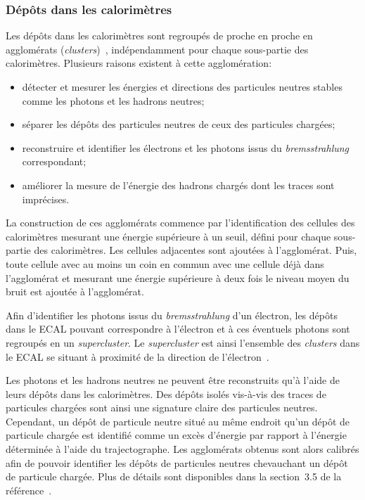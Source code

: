 \subsubsection{Dépôts dans les calorimètres}
Les dépôts dans les calorimètres sont regroupés de proche en proche en agglomérats (\emph{clusters})~\cite{particle-flow}, indépendamment pour chaque sous-partie des calorimètres.
Plusieurs raisons existent à cette agglomération:
\begin{itemize}
\item détecter et mesurer les énergies et directions des particules neutres stables comme les photons et les hadrons neutres;
\item séparer les dépôts des particules neutres de ceux des particules chargées;
\item reconstruire et identifier les électrons et les photons issus du \emph{bremsstrahlung} correspondant;
\item améliorer la mesure de l'énergie des hadrons chargés dont les traces sont imprécises.
\end{itemize}
\par La construction de ces agglomérats commence par l'identification des cellules des calorimètres mesurant une énergie supérieure à un seuil, défini pour chaque sous-partie des calorimètres.
Les cellules adjacentes sont ajoutées à l'agglomérat.
Puis, toute cellule avec au moins un coin en commun avec une cellule déjà dans l'agglomérat et mesurant une énergie supérieure à deux fois le niveau moyen du bruit est ajoutée à l'agglomérat.
\par
Afin d'identifier les photons issus du \emph{bremsstrahlung} d'un électron, les dépôts dans le ECAL pouvant correspondre à l'électron et à ces éventuels photons sont regroupés en un \emph{supercluster}.
Le \emph{supercluster} est ainsi l'ensemble des \emph{clusters} dans le ECAL se situant à proximité de la direction de l'électron~\cite{particle-flow}.
\par Les photons et les hadrons neutres ne peuvent être reconstruits qu'à l'aide de leurs dépôts dans les calorimètres.
Des dépôts isolés vis-à-vis des traces de particules chargées sont ainsi une signature claire des particules neutres.
Cependant, un dépôt de particule neutre situé au même endroit qu'un dépôt de particule chargée est identifié comme un excès d'énergie par rapport à l'énergie déterminée à l'aide du trajectographe.
Les agglomérats obtenus sont alors calibrés afin de pouvoir identifier les dépôts de particules neutres chevauchant un dépôt de particule chargée.
Plus de détails sont disponibles dans la section~3.5 de la référence~\cite{particle-flow}.